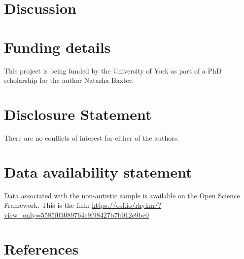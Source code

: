 \documentclass[
]{article}
\begin{document}
\hypertarget{discussion}{%
\section*{Discussion}\label{discussion}}

\hypertarget{funding-details}{%
\section*{Funding details}\label{funding-details}}

This project is being funded by the University of York as part of a PhD scholarship for the author Natasha Baxter.

\hypertarget{disclosure-statement}{%
\section*{Disclosure Statement}\label{disclosure-statement}}

There are no conflicts of interest for either of the authors.

\hypertarget{data-availability-statement}{%
\section*{Data availability statement}\label{data-availability-statement}}

Data associated with the non-autistic sample is available on the Open Science Framework. This is the link: \url{https://osf.io/rhykm/?view_only=5585f03089764c9f98427b7b012c9bc0}

\hypertarget{references}{%
\section*{References}\label{references}}
\end{document}
